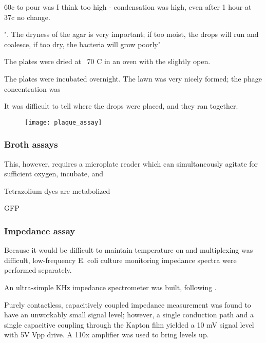 \documentclass[paper.tex]{subfiles}
\begin{document}
\begin{toolchain}
60c to pour was I think too high - condensation was high, even after 1 hour at 37c no change.

". The dryness of the agar is very important; if too moist, the
drops will run and coalesce, if too dry, the bacteria will grow
poorly"

The plates were dried at ~70 C in an oven with the slightly open.

The plates were incubated overnight. The lawn was very nicely formed; the phage concentration was

It was difficult to tell where the drops were placed, and they ran together.


\begin{figure}[H]
	\captionsetup{singlelinecheck = false, justification=justified}
	\centering
	\texttt{[image: plaque\_assay]}
\end{figure}



\end{toolchain}










\subsubsection{Broth assays}

This, however, requires a microplate reader which can simultaneously agitate for sufficient oxygen, incubate, and 

Tetrazolium dyes are metabolized 

GFP


\subsubsection{Impedance assay}


Because it would be difficult to maintain temperature on and multiplexing was difficult, low-frequency E. coli culture monitoring impedance spectra were performed separately.

An ultra-simple KHz impedance spectrometer was built, following \cite{unconventional2015}.

Purely contactless, capacitively coupled impedance measurement was found to have an unworkably small signal level;
however, a single conduction path and a single capacitive coupling through the Kapton film yielded a 10 mV signal level with 5V Vpp drive. A 110x amplifier was used to bring levels up.
\end{document}

